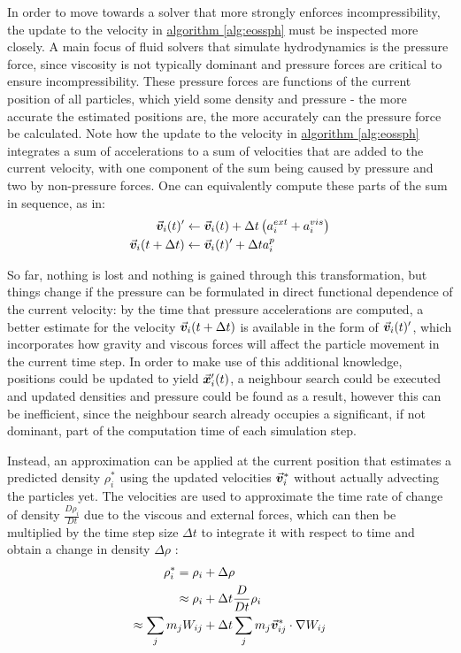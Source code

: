 In order to move towards a solver that more strongly enforces incompressibility, the update to the velocity in \hyperref[alg:eossph]{algorithm \ref{alg:eossph}} must be inspected more closely. A main focus of fluid solvers that simulate hydrodynamics is the pressure force, since viscosity is not typically dominant and pressure forces are critical to ensure incompressibility\autocite*{tutorial}. These pressure forces are functions of the current position of all particles, which yield some density and pressure - the more accurate the estimated positions are, the more accurately can the pressure force be calculated. Note how the update to the velocity in \hyperref[alg:eossph]{algorithm \ref{alg:eossph}} integrates a sum of accelerations to a sum of velocities that are added to the current velocity, with one component of the sum being caused by pressure and two by non-pressure forces. One can equivalently compute these parts of the sum in sequence, as in:
\begin{align}
  \vec{\bm{v}}_i(t)'         & \gets \vec{\bm{v}}_i(t) + \Delta t \left(a_i^{ext} + a_i^{vis}\right) \\
  \vec{\bm{v}}_i(t+\Delta t) & \gets \vec{\bm{v}}_i(t)' + \Delta t a_i^{p}
\end{align}

So far, nothing is lost and nothing is gained through this transformation, but things change if the pressure can be formulated in direct functional dependence of the current velocity: by the time that pressure accelerations are computed, a better estimate for the velocity $\vec{\bm{v}}_i(t+\Delta t)$ is available in the form of $\vec{\bm{v}}_i(t)'$, which incorporates how gravity and viscous forces will affect the particle movement in the current time step. In order to make use of this additional knowledge, positions could be updated to yield $\vec{\bm{x}}_i'(t)$, a neighbour search could be executed and updated densities and pressure could be found as a result, however this can be inefficient, since the neighbour search already occupies a significant, if not dominant, part of the computation time of each simulation step.

Instead, an approximation can be applied at the current position that estimates a predicted density $\rho_i^*$ using the updated velocities $\vec{\bm{v}}_i^*$ without actually advecting the particles yet. The velocities are used to approximate the time rate of change of density $\frac{D\rho_i}{Dt}$ due to the viscous and external forces, which can then be multiplied by the time step size $\Delta t$ to integrate it with respect to time and obtain a change in density $\Delta\rho$ \autocite*{teschner-lecture}:
\begin{align}\label{eq:predicted-density-from-v-star}
  \rho_i^*  = \rho_i        & +\Delta\rho                                            \\
  \approx \rho_i            & + \Delta t \frac{D}{Dt}\rho_i                          \\
  \approx \sum_j m_j W_{ij} & + \Delta t \sum_j m_j \vec{\bm{v}}^*_{ij}\cdot\nabla W_{ij}
\end{align}


